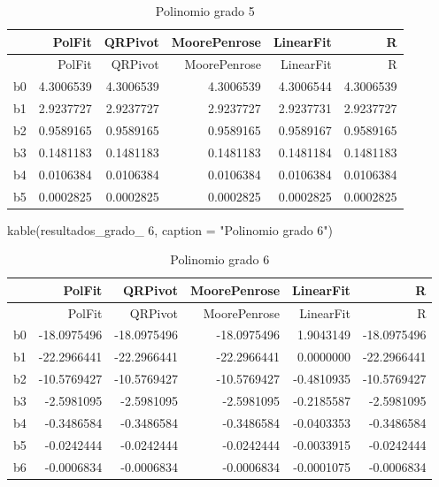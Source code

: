 \documentclass[
]{article}
\newenvironment{Shaded}{\begin{snugshade}}{\end{snugshade}}
\newcommand{\AttributeTok}[1]{\textcolor[rgb]{0.77,0.63,0.00}{#1}}
\newcommand{\FunctionTok}[1]{\textcolor[rgb]{0.00,0.00,0.00}{#1}}
\newcommand{\NormalTok}[1]{#1}
\newcommand{\StringTok}[1]{\textcolor[rgb]{0.31,0.60,0.02}{#1}}
\begin{document}
\begin{longtable}[]{@{}lrrrrr@{}}
\caption{Polinomio grado 5}\tabularnewline
\toprule
& PolFit & QRPivot & MoorePenrose & LinearFit & R \\
\midrule
\endfirsthead
\toprule
& PolFit & QRPivot & MoorePenrose & LinearFit & R \\
\midrule
\endhead
b0 & 4.3006539 & 4.3006539 & 4.3006539 & 4.3006544 & 4.3006539 \\
b1 & 2.9237727 & 2.9237727 & 2.9237727 & 2.9237731 & 2.9237727 \\
b2 & 0.9589165 & 0.9589165 & 0.9589165 & 0.9589167 & 0.9589165 \\
b3 & 0.1481183 & 0.1481183 & 0.1481183 & 0.1481184 & 0.1481183 \\
b4 & 0.0106384 & 0.0106384 & 0.0106384 & 0.0106384 & 0.0106384 \\
b5 & 0.0002825 & 0.0002825 & 0.0002825 & 0.0002825 & 0.0002825 \\
\bottomrule
\end{longtable}

\begin{Shaded}
\begin{Highlighting}[]
\FunctionTok{kable}\NormalTok{(}\StringTok{\textasciigrave{}}\AttributeTok{resultados\_grado\_ 6}\StringTok{\textasciigrave{}}\NormalTok{, }\AttributeTok{caption =} \StringTok{"Polinomio grado 6"}\NormalTok{)}
\end{Highlighting}
\end{Shaded}

\begin{longtable}[]{@{}lrrrrr@{}}
\caption{Polinomio grado 6}\tabularnewline
\toprule
& PolFit & QRPivot & MoorePenrose & LinearFit & R \\
\midrule
\endfirsthead
\toprule
& PolFit & QRPivot & MoorePenrose & LinearFit & R \\
\midrule
\endhead
b0 & -18.0975496 & -18.0975496 & -18.0975496 & 1.9043149 &
-18.0975496 \\
b1 & -22.2966441 & -22.2966441 & -22.2966441 & 0.0000000 &
-22.2966441 \\
b2 & -10.5769427 & -10.5769427 & -10.5769427 & -0.4810935 &
-10.5769427 \\
b3 & -2.5981095 & -2.5981095 & -2.5981095 & -0.2185587 & -2.5981095 \\
b4 & -0.3486584 & -0.3486584 & -0.3486584 & -0.0403353 & -0.3486584 \\
b5 & -0.0242444 & -0.0242444 & -0.0242444 & -0.0033915 & -0.0242444 \\
b6 & -0.0006834 & -0.0006834 & -0.0006834 & -0.0001075 & -0.0006834 \\
\bottomrule
\end{longtable}
\end{document}
